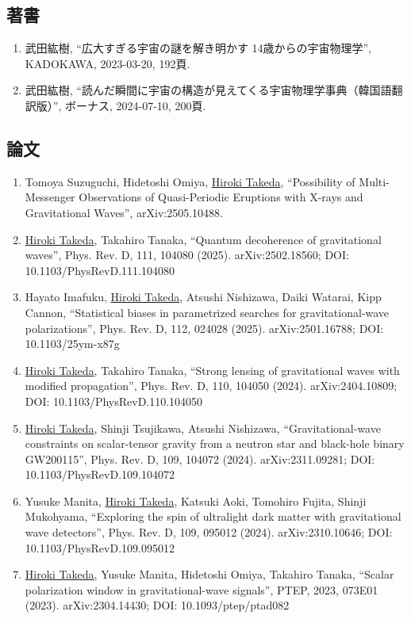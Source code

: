 \documentclass[uplatex, 11pt]{jsarticle}
\begin{document}
\subsection*{著書}
\begin{enumerate}
\item 武田紘樹, “広大すぎる宇宙の謎を解き明かす 14歳からの宇宙物理学”, KADOKAWA, 2023-03-20, 192頁.
\item 武田紘樹, “読んだ瞬間に宇宙の構造が見えてくる宇宙物理学事典（韓国語翻訳版）”, ボーナス, 2024-07-10, 200頁.
\end{enumerate}
\subsection*{論文}
\begin{enumerate}
\item Tomoya Suzuguchi, Hidetoshi Omiya, \uline{Hiroki Takeda}, “Possibility of Multi-Messenger Observations of Quasi-Periodic Eruptions with X-rays and Gravitational Waves”, arXiv:2505.10488.
\item \uline{Hiroki Takeda}, Takahiro Tanaka, “Quantum decoherence of gravitational waves”, Phys. Rev. D, 111, 104080 (2025). arXiv:2502.18560; DOI: 10.1103/PhysRevD.111.104080
\item Hayato Imafuku, \uline{Hiroki Takeda}, Atsushi Nishizawa, Daiki Watarai, Kipp Cannon, “Statistical biases in parametrized searches for gravitational-wave polarizations”, Phys. Rev. D, 112, 024028 (2025). arXiv:2501.16788; DOI: 10.1103/25ym-x87g
\item \uline{Hiroki Takeda}, Takahiro Tanaka, “Strong lensing of gravitational waves with modified propagation”, Phys. Rev. D, 110, 104050 (2024). arXiv:2404.10809; DOI: 10.1103/PhysRevD.110.104050
\item \uline{Hiroki Takeda}, Shinji Tsujikawa, Atsushi Nishizawa, “Gravitational-wave constraints on scalar-tensor gravity from a neutron star and black-hole binary GW200115”, Phys. Rev. D, 109, 104072 (2024). arXiv:2311.09281; DOI: 10.1103/PhysRevD.109.104072
\item Yusuke Manita, \uline{Hiroki Takeda}, Katsuki Aoki, Tomohiro Fujita, Shinji Mukohyama, “Exploring the spin of ultralight dark matter with gravitational wave detectors”, Phys. Rev. D, 109, 095012 (2024). arXiv:2310.10646; DOI: 10.1103/PhysRevD.109.095012
\item \uline{Hiroki Takeda}, Yusuke Manita, Hidetoshi Omiya, Takahiro Tanaka, “Scalar polarization window in gravitational-wave signals”, PTEP, 2023, 073E01 (2023). arXiv:2304.14430; DOI: 10.1093/ptep/ptad082

\end{enumerate}
\end{document}

